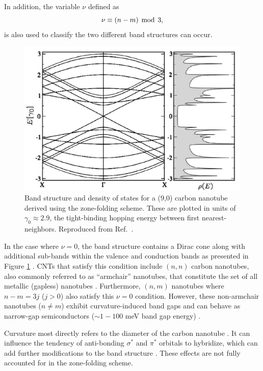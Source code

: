 In addition, the variable $\nu$ defined as
%
\begin{equation}
\label{eq:nu_cnt}
\nu \equiv (n-m) \mathrm{\hspace{1.5mm} mod \hspace{1.5mm}} 3,
\end{equation}
%
is also used to classify the two different band structures can occur.
%
\begin{figure}[h]
	\centering
	\includegraphics[scale=0.36]{images/chapter_optical_props/nine_zero_band_charlier}
	\caption{Band structure and density of states for a (9,0) carbon nanotube derived using the zone-folding scheme. These are plotted in units of $\gamma_0 \approx 2.9$, the tight-binding hopping energy between first nearest-neighbors. Reproduced from Ref.\ \cite{charlier2007electronic}.}
	\label{fig:nine_zero_cnt}
\end{figure}
%
In the case where $\nu = 0 $, the band structure contains a Dirac cone along with additional sub-bands within the valence and conduction bands as presented in Figure \ref{fig:nine_zero_cnt} . CNTs that satisfy this condition include $(n,n)$ carbon nanotubes, also commonly referred to as ``armchair'' nanotubes, that constitute the set of all metallic (gapless) nanotubes \cite{nanot2012optoelectronic}. Furthermore, $(n,m)$ nanotubes where $n-m = 3j$ ($j > 0$) also satisfy this $\nu = 0$ condition. However, these non-armchair nanotubes ($n\neq m$) exhibit curvature-induced band gaps and can behave as narrow-gap semiconductors ($\sim1 - 100$ meV band gap energy) \cite{nanot2012optoelectronic}.

Curvature most directly refers to the diameter of the carbon nanotube \cite{blase1994hybridization}. It can influence the tendency of anti-bonding $\sigma^*$ and $\pi^*$ orbitals to hybridize, which can add further modifications to the band structure \cite{blase1994hybridization}. These effects are not fully accounted for in the zone-folding scheme.

